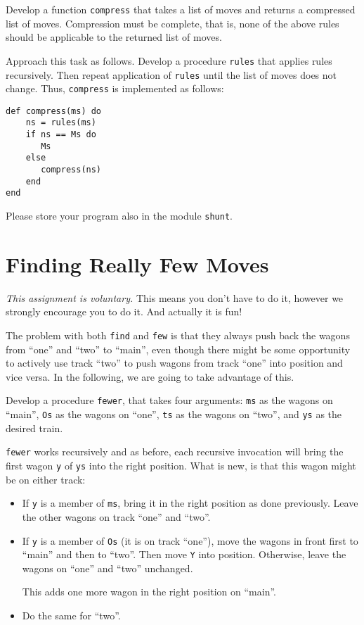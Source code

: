 \documentclass[a4paper,11pt]{article}
\begin{document}
Develop a function \verb+compress+ that takes a list of moves and
returns a compressed list of moves. Compression must be complete,
that is, none of the above rules should be applicable to the
returned list of moves.

Approach this task as follows. Develop a procedure
\verb+rules+ that applies rules recursively. Then repeat
application of \verb+rules+ until the list of moves does not
change. Thus, \verb+compress+ is implemented as follows:
\begin{verbatim}
def compress(ms) do
    ns = rules(ms)
    if ns == Ms do 
       Ms
    else
       compress(ns)
    end
end
\end{verbatim}

Please store your program also in the module \verb+shunt+.

\section{Finding Really Few Moves}

\emph{This assignment is voluntary.} This means you don't have to
do it, however we strongly encourage you to do it. And actually
it is fun!

The problem with both \verb+find+ and \verb+few+ is that they
always push back the wagons from ``one'' and ``two'' to ``main'',
even though there might be some opportunity to actively use track
``two'' to push wagons from track ``one'' into position and vice
versa. In the following, we are going to take advantage of this.

Develop a procedure \verb+fewer+, that takes four arguments:
\verb+ms+ as the wagons on ``main'', \verb+Os+ as the wagons on ``one'',
\verb+ts+ as the wagons on ``two'', and \verb+ys+ as the desired train.

\verb+fewer+ works recursively and as before, each recursive
invocation will bring the first wagon \verb+y+ of \verb+ys+ into the right
position. What is new, is that this wagon might be on either
track:
\begin{itemize}
\item If \verb+y+ is a member of \verb+ms+, bring it in the right
  position as done previously. Leave the other wagons on track
  ``one'' and ``two''.
\item If \verb+y+ is a member of \verb+Os+ (it is on track ``one''), move
  the wagons in front first to ``main'' and then to ``two''. Then
  move \verb+Y+ into position. Otherwise, leave the wagons on ``one''
  and ``two'' unchanged.

  This adds one more wagon in the right position on ``main''.
\item Do the same for ``two''.
\end{itemize}
\end{document}
